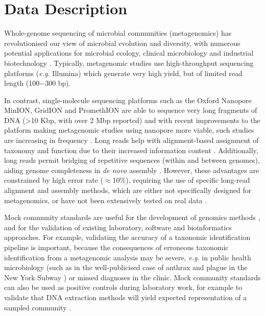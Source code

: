 \documentclass[a4paper,num-refs]{oup-contemporary}
\begin{document}

\section{Data Description}

Whole-genome sequencing of microbial communities (metagenomics) has revolutionised our view of microbial evolution and diversity, with numerous potential applications for microbial ecology, clinical microbiology and industrial biotechnology \cite{Handelsman2004-lg,Hug2016-wz}.
Typically, metagenomic studies use high-throughput sequencing platforms (\textit{e.g.} Illumina) \cite{Quince2017-lf} which generate very high yield, but of limited read length (100$-$300 bp).

In contrast, single-molecule sequencing platforms such as the Oxford Nanopore MinION, GridION and PromethION are able to sequence very long fragments of DNA (>10 Kbp, with over 2 Mbp reported) \cite{Jain2018-aw,Payne2018-cv} and with recent improvements to the platform making metagenomic studies using nanopore more viable, such studies are increasing in frequency \cite{Sanderson2018-zf,Charalampous2018-fl,Somerville2018-mq,Leggett2017-sx}. 
Long reads help with alignment-based assignment of taxonomy and function due to their increased information content \cite{Huson2007-mk,Wommack2008-qf}. 
Additionally, long reads permit bridging of repetitive sequences (within and between genomes), aiding genome completeness in \textit{de novo} assembly \cite{Bertrand2018-lz}.
However, these advantages are constrained by high error rate ($\approx$10\%), requiring the use of specific long-read alignment and assembly methods, which are either not specifically designed for metagenomics, or have not been extensively tested on real data \cite{sczyrba2017critical}.

Mock community standards are useful for the development of genomics methods \cite{Mason2017-yj}, and for the validation of existing laboratory, software and bioinformatics approaches. For example, validating the accuracy of a taxonomic identification pipeline is important, because the consequences of erroneous taxonomic identification from a metagenomic analysis may be severe, \textit{e.g.} in public health microbiology (such as in the well-publicised case of anthrax and plague in the New York Subway \cite{Ackelsberg2015-fh}) or missed diagnoses in the clinic. Mock community standards can also be used as positive controls during laboratory work, for example to validate that DNA extraction methods will yield expected representation of a sampled community \cite{Mason2017-yj}. 
\end{document}
